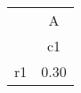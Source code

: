 \begin{tabular}{l*{1}{c}}
\hline\hline
            &           A\\
            &          c1\\
\hline
r1          &        0.30\\
\hline\hline
\end{tabular}
